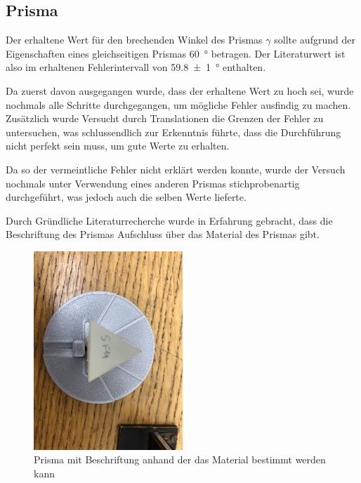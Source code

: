 \documentclass[11pt,ngerman]{scrartcl}
\begin{document}
\subsection{Prisma}

Der erhaltene Wert für den brechenden Winkel des Prismas $\gamma$ sollte
aufgrund der Eigenschaften eines gleichseitigen Prismas \SI{60}{\degree}
betragen. \cite{Kuchling} Der Literaturwert ist also im erhaltenen
Fehlerintervall von \SI{59.8(10)}{\degree} enthalten.

\vspace{2mm}

Da zuerst davon ausgegangen wurde, dass der erhaltene Wert zu hoch sei, wurde nochmals alle Schritte durchgegangen, um mögliche Fehler ausfindig zu machen. Zusätzlich wurde Versucht durch Translationen die Grenzen der Fehler zu untersuchen, was schlussendlich zur Erkenntnis führte, dass die Durchführung nicht perfekt sein muss, um gute Werte zu erhalten.

Da so der vermeintliche Fehler nicht erklärt werden konnte, wurde der Versuch nochmals unter Verwendung eines anderen Prismas stichprobenartig durchgeführt, was jedoch auch die selben Werte lieferte.

\vspace{2mm}

Durch Gründliche Literaturrecherche wurde in Erfahrung gebracht, dass die Beschriftung des Prismas Aufschluss über das Material des Prismas gibt.

\begin{figure}[H]
	\begin{center}
		\includegraphics[width=0.5\textwidth]{prisma_fs}
	\end{center}
	\caption{Prisma mit Beschriftung anhand der das Material bestimmt werden kann}
	\label{fig:prisma_fs}
\end{figure}
\end{document}
